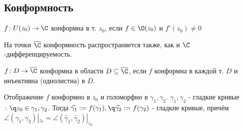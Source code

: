 \subsection{Конформность}
\begin{definition}
  $f\colon U(z_0)\to\C$ конформна в т. $z_0$, если $f\in \O(z_0)$ и $f'(z_0)\neq 0$ 
\end{definition}
На точки $\overline{\C}$ конформность распространяется также, как и $\C$-дифференцируемость. 
\begin{definition}
  $f\colon D\to\overline{\C}$ конформна в области $D\subseteq \overline{\C}$, если $f$ конформна в каждой т. $D$ и инъективна (однолистна) в $D$.
\end{definition}

\begin{theorem}
  Отображение $f$ конформно в $z_0$ и голоморфно в $\gamma_1,\gamma_2$. $\gamma_1,\gamma_2$ - гладкие кривые $\colon\q z_0\in \gamma_1,\gamma_2$. Тогда $\widetilde{\gamma_1}:=f(\gamma_1),\q \widetilde{\gamma_2}:=f(\gamma_2)$ - гладкие кривые, причём $\angle(\gamma_1,\gamma_2)|_{z_0} = \angle(\widetilde{\gamma_1},\widetilde{\gamma_2})|_{z_0}$ 
\end{theorem}
